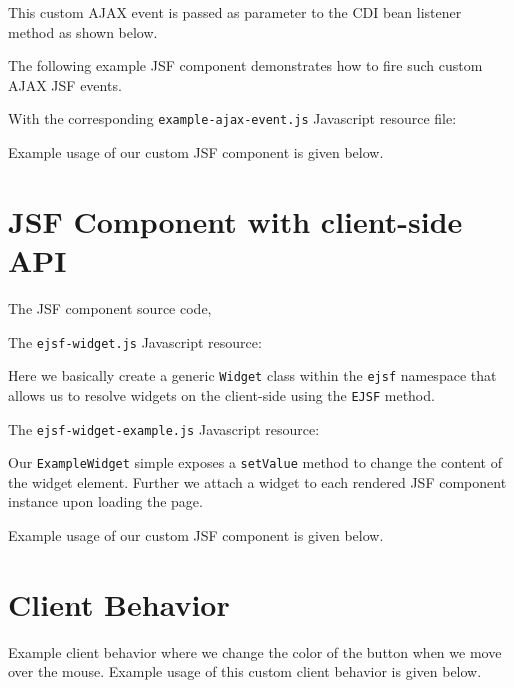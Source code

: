 This custom AJAX event is passed as parameter to the CDI bean listener method as shown below.


The following example JSF component demonstrates how to fire such custom AJAX JSF events.


With the corresponding \texttt{example-ajax-event.js} Javascript resource file:


Example usage of our custom JSF component is given below.


\section{JSF Component with client-side API}
The JSF component source code,


The \texttt{ejsf-widget.js} Javascript resource:

Here we basically create a generic \texttt{Widget} class within the \texttt{ejsf} namespace that allows us to resolve widgets on the client-side using the \texttt{EJSF} method.

The \texttt{ejsf-widget-example.js} Javascript resource:

Our \texttt{ExampleWidget} simple exposes a \texttt{setValue} method to change the content of the widget element.
Further we attach a widget to each rendered JSF component instance upon loading the page.

Example usage of our custom JSF component is given below.


\section{Client Behavior}
Example client behavior where we change the color of the button when we move over the mouse.
Example usage of this custom client behavior is given below.


